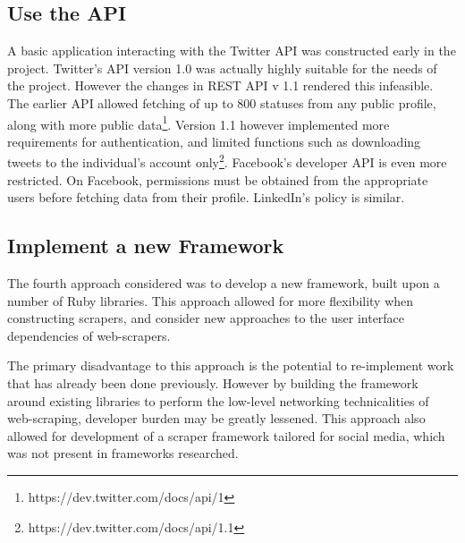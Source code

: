 \subsection{Use the API}

A basic application interacting with the Twitter API was constructed early in the project. Twitter's API version 1.0 was actually highly suitable for the needs of the project. However the changes in REST API v 1.1 rendered this infeasible. The earlier API allowed fetching of up to 800 statuses from any public profile, along with more public data\footnote{https://dev.twitter.com/docs/api/1}. Version 1.1 however implemented more requirements for authentication, and limited functions such as downloading tweets to the individual's account only\footnote{https://dev.twitter.com/docs/api/1.1}. Facebook's developer API is even more restricted. On Facebook, permissions must be obtained from the appropriate users before fetching data from their profile. LinkedIn's policy is similar. %

\subsection{Implement a new Framework}

The fourth approach considered was to develop a new framework, built upon a number of Ruby libraries. This approach allowed for more flexibility when constructing scrapers, and consider new approaches to the user interface dependencies of web-scrapers. 

The primary disadvantage to this approach is the potential to re-implement work that has already been done previously. However by building the framework around existing libraries to perform the low-level networking technicalities of web-scraping, developer burden may be greatly lessened. This approach also allowed for development of a scraper framework tailored for social media, which was not present in frameworks researched.



